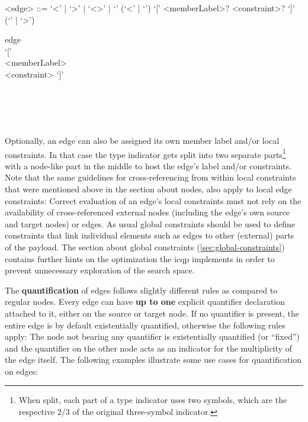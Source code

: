 \documentclass[11pt,a4paper]{report}
\begin{document}
\begin{gram}
	\label{gram:edge}
	\begin{grammar}	
		<edge> ::= `\textless\textminus\textminus' | `\textminus\textminus\textgreater' | `\textless\textminus\textgreater' | `\textminus\textminus\textminus'
		\alt (`\textless\textminus' | `\textminus\textminus') `[' <memberLabel>? <constraint>? `]' (`\textminus\textminus' | `\textminus\textgreater')
	\end{grammar}
	\diagsep
	\begin{rrdiag*}{edge}
		\sst 
		\sst \lit{\textless\textminus} \\ \lit{\textminus\textminus} \est `[' 
		\sst \\ <memberLabel> \est
		\sst \\ <constraint> \est `]' 
		\sst \lit{\textminus\textminus} \\ \lit{\textminus\textgreater} \est \\
		\lit{\textless\textminus\textminus} \\
		\lit{\textminus\textminus\textgreater} \\ 
		\lit{\textless\textminus\textgreater} \\
		\lit{\textminus\textminus\textminus}
		\est
	\end{rrdiag*}
\end{gram}

Optionally, an edge can also be assigned its own member label and/or local constraints.
In that case the type indicator gets split into two separate parts\footnote{When split, each part of a type indicator uses two symbols, which are the respective 2/3 of the original three-symbol indicator.} with a node-like part in the middle to host the edge's label and/or constraints.
Note that the same guidelines for cross-referencing from within local constraints that were mentioned above in the section about nodes, also apply to local edge constraints: 
Correct evaluation of an edge's local constraints must not rely on the availability of cross-referenced external nodes (including the edge's own source and target nodes) or edges.
As usual global constraints should be used to define constraints that link individual elements such as edges to other (external) parts of the payload.
The section about global constraints (\ref{sec:global-constraints}) contains further hints on the optimization the \ac{icqp} implements in order to prevent unnecessary exploration of the search space.

The \textbf{quantification} of edges follows slightly different rules as compared to regular nodes.
Every edge can have \textbf{up to one} explicit quantifier declaration attached to it, either on the source or target node.
If no quantifier is present, the entire edge is by default existentially quantified, otherwise the following rules apply:
The node not bearing any quantifier is existentially quantified (or ``fixed'') and the quantifier on the other node acts as an indicator for the multiplicity of the edge itself.
The following examples illustrate some use cases for quantification on edges:
\end{document}
